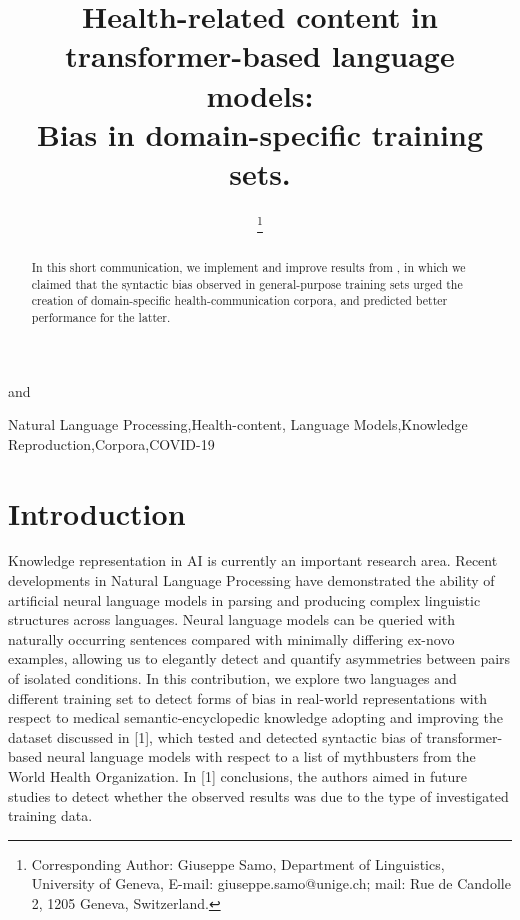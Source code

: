 \documentclass{IOS-Book-Article}
\def\hb{\hbox to 11.5 cm{}}
\begin{document}
\pagestyle{headings}
\def\thepage{}
\begin{frontmatter}              %


\title{Health-related content in transformer-based language models:\\ Bias in domain-specific training sets.}

\markboth{}{January 2023\hb}


\author[A]{ %
}
and
\author[B]{ 
\thanks{Corresponding Author: Giuseppe Samo, Department of Linguistics, University of Geneva, E-mail: giuseppe.samo@unige.ch; mail: Rue de Candolle 2, 1205 Geneva, Switzerland. }}
\address[A]{University of Cambridge}
\address[B]{University of Geneva}

\begin{abstract}
In this short communication, we implement and improve results from \cite{r1}, in which we claimed that the syntactic bias observed in general-purpose training sets urged the creation of domain-specific health-communication corpora, and predicted better performance for the latter. 
\end{abstract}

\begin{keyword}
Natural Language Processing\sep Health-content\sep 
Language Models\sep Knowledge Reproduction\sep Corpora\sep COVID-19
\end{keyword}
\end{frontmatter}
\markboth{April 2022\hb}{April 2022\hb}

\section{Introduction}

Knowledge representation in AI is currently an important research area. 
Recent developments in Natural Language Processing have
demonstrated the ability of artificial neural language models in parsing and producing complex linguistic structures across languages. Neural language models can be queried with naturally occurring sentences compared with minimally differing ex-novo examples, allowing us to elegantly detect and quantify asymmetries between pairs of isolated conditions.
In this contribution, we explore two languages and different training set to detect forms of bias in real-world representations with respect to medical semantic-encyclopedic knowledge adopting and improving the dataset discussed in [1], which tested and detected syntactic bias of transformer-based neural language models with respect to a list of mythbusters from the World Health Organization.
In [1] conclusions, the authors aimed in future studies to detect whether the observed results was due to the type of investigated training data.
\end{document}

